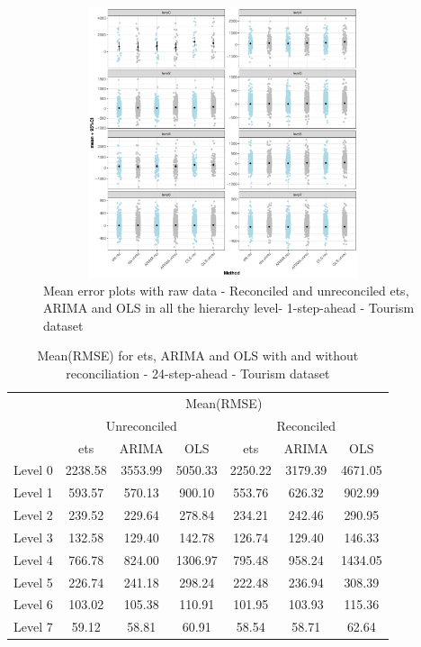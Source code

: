 \documentclass[11pt,a4paper,]{article}
\begin{document}
\begin{figure}

{\centering \includegraphics[width=400px,height=300px]{Paper-Figures/results_Tourism/boxplot_raw_data_1_step} 

}

\caption{Mean error plots with raw data -  Reconciled and unreconciled ets, ARIMA and OLS in all the hierarchy level- 1-step-ahead - Tourism dataset}\label{fig:errorplotrollingtourism}
\end{figure}

\begin{table}[t]

\caption{\label{tab:TourismdataresultRMSE}Mean(RMSE) for ets, ARIMA and OLS with and without reconciliation - 24-step-ahead - Tourism dataset}
\centering
\begin{tabular}{ccccccc}
\toprule
\multicolumn{1}{c}{} & \multicolumn{6}{c}{Mean(RMSE)} \\
\cmidrule(l{2pt}r{2pt}){2-7}
\multicolumn{1}{c}{} & \multicolumn{3}{c}{Unreconciled} & \multicolumn{3}{c}{Reconciled} \\
\cmidrule(l{2pt}r{2pt}){2-4} \cmidrule(l{2pt}r{2pt}){5-7}
 & ets & ARIMA & OLS & ets & ARIMA & OLS\\
\midrule
Level 0 & 2238.58 & 3553.99 & 5050.33 & 2250.22 & 3179.39 & 4671.05\\
Level 1 & 593.57 & 570.13 & 900.10 & 553.76 & 626.32 & 902.99\\
Level 2 & 239.52 & 229.64 & 278.84 & 234.21 & 242.46 & 290.95\\
Level 3 & 132.58 & 129.40 & 142.78 & 126.74 & 129.40 & 146.33\\
Level 4 & 766.78 & 824.00 & 1306.97 & 795.48 & 958.24 & 1434.05\\
Level 5 & 226.74 & 241.18 & 298.24 & 222.48 & 236.94 & 308.39\\
Level 6 & 103.02 & 105.38 & 110.91 & 101.95 & 103.93 & 115.36\\
Level 7 & 59.12 & 58.81 & 60.91 & 58.54 & 58.71 & 62.64\\
\bottomrule
\end{tabular}
\end{table}
\end{document}
